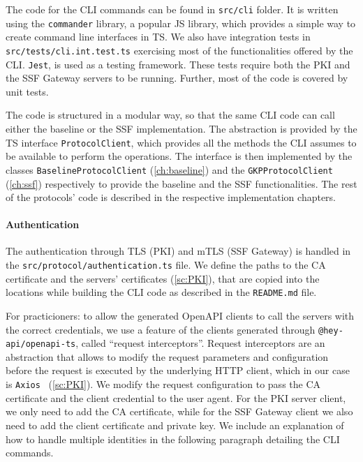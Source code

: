 The code for the CLI commands can be found in \texttt{src/cli} folder.
It is written using the \texttt{commander} library, a popular
JS library, which provides a simple way to 
create command line interfaces in TS.
We also have integration tests in \texttt{src/tests/cli.int.test.ts}
exercising most of the functionalities offered by the CLI.
\texttt{Jest}, is used as a testing framework.
These tests require both the PKI and the SSF Gateway servers to be running.
Further, most of the code is covered by unit tests.

The code is structured in a modular way, so that the same CLI
code can call either the baseline or the SSF implementation.
The abstraction is provided by the TS interface \texttt{ProtocolClient},
which provides all the methods the CLI assumes to be available
to perform the operations. The interface is then
implemented by the classes \texttt{BaselineProtocolClient} (\cref{ch:baseline})
and the \texttt{GKPProtocolClient} (\cref{ch:ssf})
respectively to provide the baseline and the SSF functionalities.
The rest of the protocols' code is described in the respective
implementation chapters.

\paragraph{Authentication}
The authentication through TLS (PKI) and mTLS (SSF Gateway)
is handled in the \texttt{src/protocol/authentication.ts} file.
We define the paths to the CA certificate and 
the servers' certificates (\cref{sc:PKI}), that are copied
into the locations while building the CLI code
as described in the \texttt{README.md} file.

For practicioners: to allow the generated OpenAPI clients to call
the servers with the correct credentials,
we use a feature of the clients generated through \texttt{@hey-api/openapi-ts}, called ``request interceptors''.
Request interceptors are an abstraction that allows
to modify the request parameters and configuration
before the request is executed by the underlying HTTP client,
which in our case is \texttt{Axios}~\cite{OpenAPIAxios} (\cref{sc:PKI}).
We modify the request configuration to pass the
CA certificate and the client credential
to the user agent. For the PKI server client,
we only need to add the CA certificate,
while for the SSF Gateway client we also need to
add the client certificate and private key.
We include an explanation of how to handle multiple
identities in the following paragraph detailing the CLI commands.


